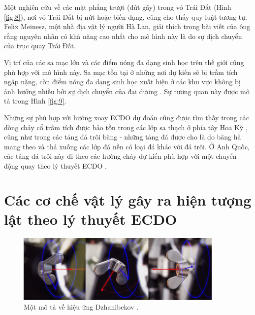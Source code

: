 \documentclass[10pt,twocolumn,letterpaper]{article}
\begin{document}
Một nghiên cứu về các mặt phẳng trượt (đứt gãy) trong vỏ Trái Đất (Hình \ref{fig:8}), nơi vỏ Trái Đất bị nứt hoặc biến dạng, cũng cho thấy quy luật tương tự. Felix Meinesz, một nhà địa vật lý người Hà Lan, giải thích trong bài viết của ông \cite{36} rằng nguyên nhân có khả năng cao nhất cho mô hình này là do sự dịch chuyển của trục quay Trái Đất.

Vị trí của các sa mạc lớn và các điểm nóng đa dạng sinh học trên thế giới cũng phù hợp với mô hình này. Sa mạc tồn tại ở những nơi dự kiến sẽ bị trầm tích ngập nặng, còn điểm nóng đa dạng sinh học xuất hiện ở các khu vực không bị ảnh hưởng nhiều bởi sự dịch chuyển của đại dương \cite{28}. Sự tương quan này được mô tả trong Hình \ref{fig:9}.

Những sự phù hợp với hướng xoay ECDO dự đoán cũng được tìm thấy trong các dòng chảy cổ trầm tích được bảo tồn trong các lớp sa thạch ở phía tây Hoa Kỳ \cite{21}, cũng như trong các tảng đá trôi băng - những tảng đá được cho là do băng hà mang theo và thả xuống các lớp đá nền có loại đá khác với đá trôi. Ở Anh Quốc, các tảng đá trôi này đi theo các hướng chảy dự kiến phù hợp với một chuyển động quay theo lý thuyết ECDO \cite{67,68}.

\section{Các cơ chế vật lý gây ra hiện tượng lật theo lý thuyết ECDO}

\begin{figure}
\begin{center}
\includegraphics[width=0.9\textwidth]{dzhani.jpg}
\end{center}
   \caption{Một mô tả về hiệu ứng Dzhanibekov \cite{28}.}
\label{fig:10}
\end{figure}
\end{document}
